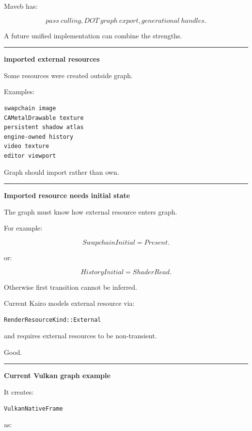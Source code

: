Maveb has:

\[
pass\ culling,
DOT\ graph\ export,
generational\ handles.
\]

A future unified implementation can combine the strengths.

\begin{center}\rule{0.5\linewidth}{0.5pt}\end{center}

\textbf{imported external resources}

Some resources were created outside graph.

Examples:

\begin{verbatim}
swapchain image
CAMetalDrawable texture
persistent shadow atlas
engine-owned history
video texture
editor viewport
\end{verbatim}

Graph should import rather than own.

\begin{center}\rule{0.5\linewidth}{0.5pt}\end{center}

\textbf{Imported resource needs initial state}

The graph must know how external resource enters graph.

For example:

\[
SwapchainInitial=Present.
\]

or:

\[
HistoryInitial=ShaderRead.
\]

Otherwise first transition cannot be inferred.

Current Kairo models external resource via:

\begin{verbatim}
RenderResourceKind::External
\end{verbatim}

and requires external resources to be non-transient.

Good.

\begin{center}\rule{0.5\linewidth}{0.5pt}\end{center}

\textbf{Current Vulkan graph example}

It creates:

\begin{verbatim}
VulkanNativeFrame
\end{verbatim}

as:

